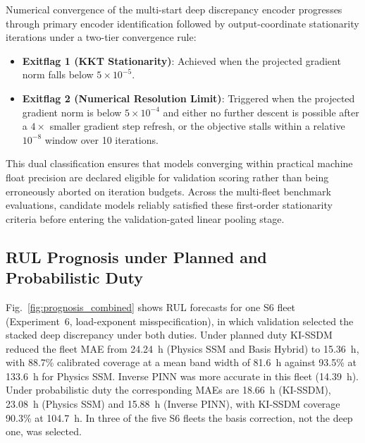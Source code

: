 \documentclass[a4paper,fleqn]{cas-dc}
\begin{document}
Numerical convergence of the multi-start deep discrepancy encoder progresses through primary encoder identification followed by output-coordinate stationarity iterations under a two-tier convergence rule:
\begin{itemize}[leftmargin=1.5em]
    \item \textbf{Exitflag 1 (KKT Stationarity)}: Achieved when the projected gradient norm falls below $5 \times 10^{-5}$.
    \item \textbf{Exitflag 2 (Numerical Resolution Limit)}: Triggered when the projected gradient norm is below $5 \times 10^{-4}$ and either no further descent is possible after a $4\times$ smaller gradient step refresh, or the objective stalls within a relative $10^{-8}$ window over 10 iterations.
\end{itemize}
This dual classification ensures that models converging within practical machine float precision are declared eligible for validation scoring rather than being erroneously aborted on iteration budgets. Across the multi-fleet benchmark evaluations, candidate models reliably satisfied these first-order stationarity criteria before entering the validation-gated linear pooling stage.

\subsection{RUL Prognosis under Planned and Probabilistic Duty}
\label{subsec:prognosis_bands}

Fig.~\ref{fig:prognosis_combined} shows RUL forecasts for one S6 fleet (Experiment~6, load-exponent misspecification), in which validation selected the stacked deep discrepancy under both duties. Under planned duty KI-SSDM reduced the fleet MAE from 24.24~h (Physics SSM and Basis Hybrid) to 15.36~h, with 88.7\% calibrated coverage at a mean band width of 81.6~h against 93.5\% at 133.6~h for Physics SSM. Inverse PINN was more accurate in this fleet (14.39~h). Under probabilistic duty the corresponding MAEs are 18.66~h (KI-SSDM), 23.08~h (Physics SSM) and 15.88~h (Inverse PINN), with KI-SSDM coverage 90.3\% at 104.7~h. In three of the five S6 fleets the basis correction, not the deep one, was selected.
\end{document}

